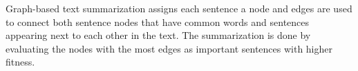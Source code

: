 \documentclass{article}
\begin{document}
	Graph-based text summarization assigns each sentence a node and edges are used to connect both sentence nodes that have common words and sentences appearing next to each other in the text. The summarization is done by evaluating the nodes with the most edges as important sentences with higher fitness. \cite{art4}
	
	
	
	
	\printbibliography
\end{document}
